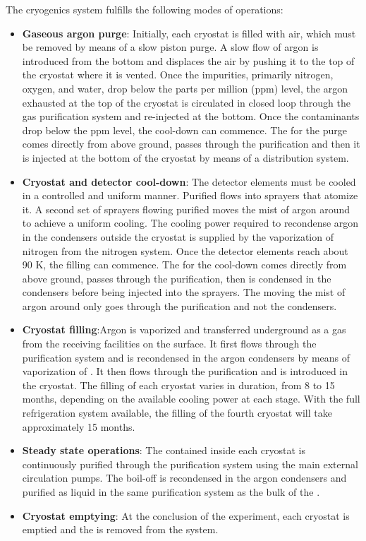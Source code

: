 The cryogenics system fulfills the following modes of operations:
\begin{itemize}
  \item {\bf Gaseous argon purge}: Initially, each cryostat is filled
    with air, which must be removed by means of a slow  piston
    purge.  A slow flow of argon is introduced from the bottom and
    displaces the air by pushing it to the top of the cryostat where
    it is vented.  Once the impurities, primarily nitrogen, oxygen, and 
    water, drop below the parts per million (ppm) level, the argon
    exhausted at the top of the cryostat is circulated in closed loop
    through the gas purification system and re-injected at the
    bottom. Once the contaminants drop below the ppm level, the
    cool-down can commence. The  for the purge comes directly from
    above ground, passes through the  purification and then it is
    injected at the bottom of the cryostat by means of a 
    distribution system.
  \item {\bf Cryostat and detector cool-down}: The detector elements
    must be cooled in a controlled and uniform manner. Purified 
    flows into sprayers that atomize it. A second set of sprayers
    flowing purified  moves the mist of argon around to achieve a
    uniform cooling. The cooling power required to recondense argon in
    the condensers outside the cryostat is supplied by the
    vaporization of nitrogen from the nitrogen system. Once the
    detector elements reach about 90 K, the filling can commence. The
     for the cool-down comes directly from above ground, passes
    through the  purification,  then is condensed in the
    condensers before being injected into the sprayers. The  moving
    the mist of argon around only goes through the  purification
    and not the condensers.
  \item {\bf Cryostat filling}:Argon is vaporized and transferred
    underground as a gas from the receiving facilities on the surface.
    It first flows through the  purification system and is
    recondensed in the argon condensers by means of vaporization of
    .  It then flows through the  purification and is introduced
    in the cryostat. The filling of each cryostat varies in duration,
    from 8 to 15 months, depending on the available cooling power at
    each stage. With the full refrigeration system available, the filling of the fourth
cryostat  will take approximately 15 months. 
  \item{\bf Steady state operations}: The  contained inside each
    cryostat is continuously purified through the  purification
    system using the main external  circulation pumps. The boil-off
     is recondensed in the argon condensers and purified as liquid
    in the same  purification system as the bulk of the .
  \item{\bf Cryostat emptying}: At the conclusion of the experiment,
    each cryostat is emptied and the  is removed from the system.
\end{itemize}
